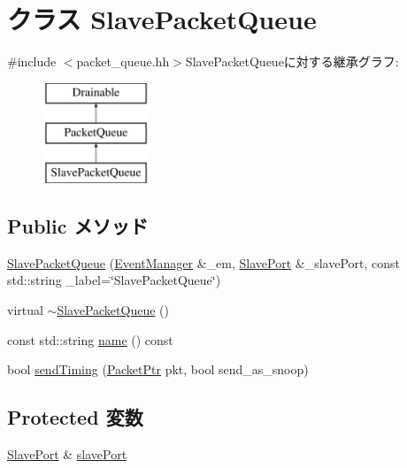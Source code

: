 \hypertarget{classSlavePacketQueue}{
\section{クラス SlavePacketQueue}
\label{classSlavePacketQueue}
}


{\ttfamily \#include $<$packet\_\-queue.hh$>$}SlavePacketQueueに対する継承グラフ:\begin{figure}[H]
\begin{center}
\leavevmode
\includegraphics[height=3cm]{classSlavePacketQueue}
\end{center}
\end{figure}
\subsection*{Public メソッド}
\begin{DoxyCompactItemize}
\item 
\hyperlink{classSlavePacketQueue_ab854538542cd0a534f1518cbdab944af}{SlavePacketQueue} (\hyperlink{classEventManager}{EventManager} \&\_\-em, \hyperlink{classSlavePort}{SlavePort} \&\_\-slavePort, const std::string \_\-label=\char`\"{}SlavePacketQueue\char`\"{})
\item 
virtual \hyperlink{classSlavePacketQueue_ab7d3616b2c677e777c22a55dcf07ea83}{$\sim$SlavePacketQueue} ()
\item 
const std::string \hyperlink{classSlavePacketQueue_a6490f765a824ced1cc94979609fe7e07}{name} () const 
\item 
bool \hyperlink{classSlavePacketQueue_a49e787c20f2f8d3e4fc0b8213bebcfc4}{sendTiming} (\hyperlink{classPacket}{PacketPtr} pkt, bool send\_\-as\_\-snoop)
\end{DoxyCompactItemize}
\subsection*{Protected 変数}
\begin{DoxyCompactItemize}
\item 
\hyperlink{classSlavePort}{SlavePort} \& \hyperlink{classSlavePacketQueue_af8e5dfce1f3b07a01c692d32d655bcf6}{slavePort}
\end{DoxyCompactItemize}


